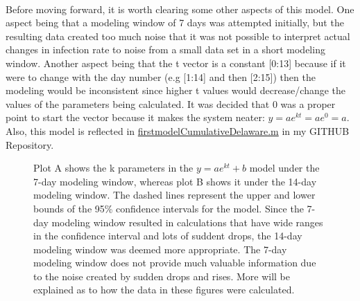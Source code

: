 \documentclass[12pt]{article}
\begin{document}
\paragraph{} Before moving forward, it is worth clearing some other aspects of this model. One aspect being that a modeling window of 7 days was attempted initially, but the resulting data created too much noise that it was not possible to interpret actual changes in infection rate to noise from a small data set in a short modeling window. Another aspect being that the t vector is a constant [0:13] because if it were to change with the day number (e.g [1:14] and then [2:15]) then the modeling would be inconsistent since higher t values would decrease/change the values of the parameters being calculated. It was decided that 0 was a proper point to start the vector because it makes the system neater: $y = ae ^ {kt} = ae^{0} = a$. Also, this model is reflected in \href{https://github.com/tatabas/delaware-covid-analysis}{firstmodelCumulativeDelaware.m} in my GITHUB Repository.
\begin{figure}[h]
  \centering
  \hfill
  \caption{Plot A shows the k parameters in the $y = ae^{kt} +b$ model under the 7-day modeling window, whereas plot B shows it under the 14-day modeling window. The dashed lines represent the upper and lower bounds of the 95\% confidence intervals for the model. Since the 7-day modeling window resulted in calculations that have wide ranges in the confidence interval and lots of suddent drops, the 14-day modeling window was deemed more appropriate. The 7-day modeling window does not provide much valuable information due to the noise created by sudden drops and rises. More will be explained as to how the data in these figures were calculated.}
  \label{fig:2}
\end{figure}
\end{document}

